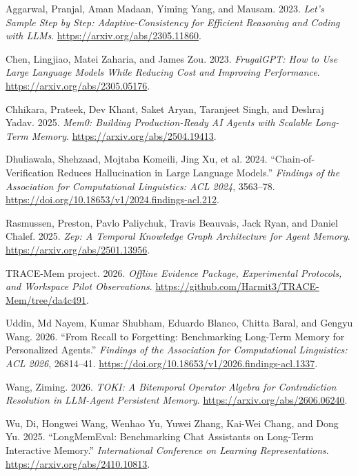 \documentclass[
  11pt,
]{article}
\newlength{\cslhangindent}
\newenvironment{CSLReferences}[2] %
 {\begin{list}{}{%
  \setlength{\itemindent}{0pt}
  \setlength{\leftmargin}{0pt}
  \setlength{\parsep}{0pt}
  \ifodd #1
   \setlength{\leftmargin}{\cslhangindent}
   \setlength{\itemindent}{-1\cslhangindent}
  \fi
  \setlength{\itemsep}{#2\baselineskip}}}
 {\end{list}}
\begin{document}
\begin{CSLReferences}{1}{1}
Aggarwal, Pranjal, Aman Madaan, Yiming Yang, and Mausam. 2023.
\emph{Let's Sample Step by Step: Adaptive-Consistency for Efficient
Reasoning and Coding with LLMs}. \url{https://arxiv.org/abs/2305.11860}.

Chen, Lingjiao, Matei Zaharia, and James Zou. 2023. \emph{{FrugalGPT}:
How to Use Large Language Models While Reducing Cost and Improving
Performance}. \url{https://arxiv.org/abs/2305.05176}.

Chhikara, Prateek, Dev Khant, Saket Aryan, Taranjeet Singh, and Deshraj
Yadav. 2025. \emph{{Mem0}: Building Production-Ready AI Agents with
Scalable Long-Term Memory}. \url{https://arxiv.org/abs/2504.19413}.

Dhuliawala, Shehzaad, Mojtaba Komeili, Jing Xu, et al. 2024.
{``Chain-of-Verification Reduces Hallucination in Large Language
Models.''} \emph{Findings of the Association for Computational
Linguistics: ACL 2024}, 3563--78.
\url{https://doi.org/10.18653/v1/2024.findings-acl.212}.

Rasmussen, Preston, Pavlo Paliychuk, Travis Beauvais, Jack Ryan, and
Daniel Chalef. 2025. \emph{Zep: A Temporal Knowledge Graph Architecture
for Agent Memory}. \url{https://arxiv.org/abs/2501.13956}.

TRACE-Mem project. 2026. \emph{Offline Evidence Package, Experimental
Protocols, and Workspace Pilot Observations}.
\url{https://github.com/Harmit3/TRACE-Mem/tree/da4c491}.

Uddin, Md Nayem, Kumar Shubham, Eduardo Blanco, Chitta Baral, and Gengyu
Wang. 2026. {``From Recall to Forgetting: Benchmarking Long-Term Memory
for Personalized Agents.''} \emph{Findings of the Association for
Computational Linguistics: ACL 2026}, 26814--41.
\url{https://doi.org/10.18653/v1/2026.findings-acl.1337}.

Wang, Ziming. 2026. \emph{{TOKI}: A Bitemporal Operator Algebra for
Contradiction Resolution in LLM-Agent Persistent Memory}.
\url{https://arxiv.org/abs/2606.06240}.

Wu, Di, Hongwei Wang, Wenhao Yu, Yuwei Zhang, Kai-Wei Chang, and Dong
Yu. 2025. {``{LongMemEval}: Benchmarking Chat Assistants on Long-Term
Interactive Memory.''} \emph{International Conference on Learning
Representations}. \url{https://arxiv.org/abs/2410.10813}.


\end{CSLReferences}
\end{document}
